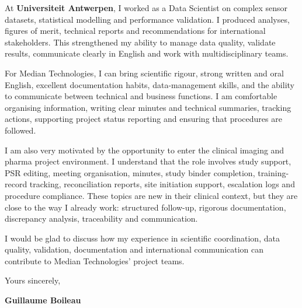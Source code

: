 \documentclass[11pt,a4paper]{altacv}
\begin{document}
{At \textbf{Universiteit Antwerpen}, I worked as a Data Scientist on complex sensor datasets, statistical modelling and performance validation. I produced analyses, figures of merit, technical reports and recommendations for international stakeholders. This strengthened my ability to manage data quality, validate results, communicate clearly in English and work with multidisciplinary teams.

For Median Technologies, I can bring scientific rigour, strong written and oral English, excellent documentation habits, data-management skills, and the ability to communicate between technical and business functions. I am comfortable organising information, writing clear minutes and technical summaries, tracking actions, supporting project status reporting and ensuring that procedures are followed.

I am also very motivated by the opportunity to enter the clinical imaging and pharma project environment. I understand that the role involves study support, PSR editing, meeting organisation, minutes, study binder completion, training-record tracking, reconciliation reports, site initiation support, escalation logs and procedure compliance. These topics are new in their clinical context, but they are close to the way I already work: structured follow-up, rigorous documentation, discrepancy analysis, traceability and communication.

I would be glad to discuss how my experience in scientific coordination, data quality, validation, documentation and international communication can contribute to Median Technologies' project teams.

Yours sincerely,

\textbf{Guillaume Boileau}

}
\end{document}
